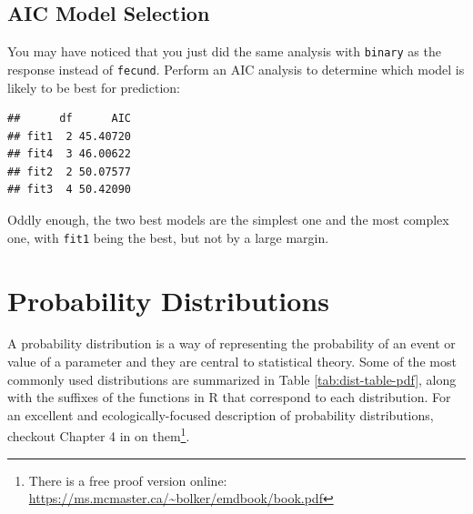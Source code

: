 \documentclass[]{book}
\newenvironment{Shaded}{\begin{snugshade}}{\end{snugshade}}
\newcommand{\KeywordTok}[1]{\textcolor[rgb]{0.13,0.29,0.53}{\textbf{#1}}}
\newcommand{\StringTok}[1]{\textcolor[rgb]{0.31,0.60,0.02}{#1}}
\newcommand{\OperatorTok}[1]{\textcolor[rgb]{0.81,0.36,0.00}{\textbf{#1}}}
\newcommand{\NormalTok}[1]{#1}
\let\rmarkdownfootnote\footnote%
\def\footnote{\protect\rmarkdownfootnote}
\theoremstyle{definition}
\theoremstyle{definition}
\theoremstyle{definition}
\theoremstyle{remark}
\begin{document}
\subsection{AIC Model Selection}\label{aic-model-selection-1}

You may have noticed that you just did the same analysis with
\texttt{binary} as the response instead of \texttt{fecund}. Perform an
AIC analysis to determine which model is likely to be best for
prediction:

\begin{Shaded}
\end{Shaded}

\begin{verbatim}
##      df      AIC
## fit1  2 45.40720
## fit4  3 46.00622
## fit2  2 50.07577
## fit3  4 50.42090
\end{verbatim}

Oddly enough, the two best models are the simplest one and the most
complex one, with \texttt{fit1} being the best, but not by a large
margin.

\section{Probability Distributions}\label{dists}

A probability distribution is a way of representing the probability of
an event or value of a parameter and they are central to statistical
theory. Some of the most commonly used distributions are summarized in
Table \ref{tab:dist-table-pdf}, along with the suffixes of the functions
in R that correspond to each distribution. For an excellent and
ecologically-focused description of probability distributions, checkout
Chapter 4 in \citet{emdbook-cite} on them\footnote{There is a free proof
  version online: \url{https://ms.mcmaster.ca/~bolker/emdbook/book.pdf}}.
\end{document}

